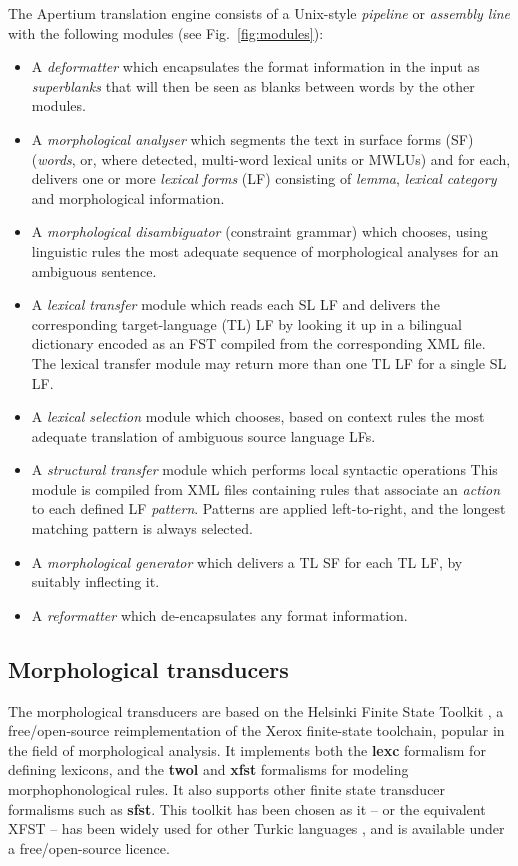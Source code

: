 \documentclass[11pt,a4paper]{article}
\begin{document}
The Apertium translation engine consists of a Unix-style \emph{pipeline} or
\emph{assembly line} with the following modules (see Fig.~\ref{fig:modules}):  
\begin{itemize}
\item A \emph{deformatter} which encapsulates the format information
 in the input as \emph{superblanks} that will then be seen
 as blanks between words by the other modules.
\item A \emph{morphological analyser} which segments the text in
  surface forms (SF) (\emph{words}, or, where detected, multi-word lexical
  units or MWLUs) and for each, delivers one or more \emph{lexical
    forms} (LF) consisting of \emph{lemma}, \emph{lexical category} and
  morphological information. 
\item A \emph{morphological disambiguator} (constraint grammar) which chooses, using linguistic rules
  the most adequate sequence of morphological analyses for an ambiguous sentence. 
\item A \emph{lexical transfer} module which reads each SL LF 
  and delivers the corresponding target-language (TL) LF
  by looking it up in a bilingual dictionary encoded as an FST
  compiled from the corresponding XML file. The lexical transfer module may
  return more than one TL LF for a single SL LF.
\item A \emph{lexical selection} module which chooses, based on context 
  rules the most adequate translation of ambiguous source language LFs.
\item A \emph{structural transfer} module which
    performs local syntactic operations This module is compiled from XML files containing rules that 
    associate an \emph{action} to each defined LF \emph{pattern}. Patterns are applied left-to-right, and the 
    longest matching pattern is always selected.
\item A \emph{morphological generator} which delivers a TL SF
 for each TL LF, by suitably inflecting it. 
\item A \emph{reformatter} which de-encapsulates any format
  information.
\end{itemize}


\subsection{Morphological transducers}

The morphological transducers are based on the Helsinki Finite State Toolkit \cite{hfst/2011}, a free/open-source reimplementation of the Xerox finite-state toolchain, popular in the field of morphological analysis. It implements both the \textbf{lexc} formalism for defining lexicons, and the \textbf{twol} and \textbf{xfst} formalisms for modeling morphophonological rules. It also supports other finite state transducer formalisms such as \textbf{sfst}. This toolkit has been chosen as it -- or the equivalent XFST -- has been widely used for other Turkic languages \cite{coltekin2010,altintas2001,tantug2006}, and is available under a free/open-source licence.
\end{document}
